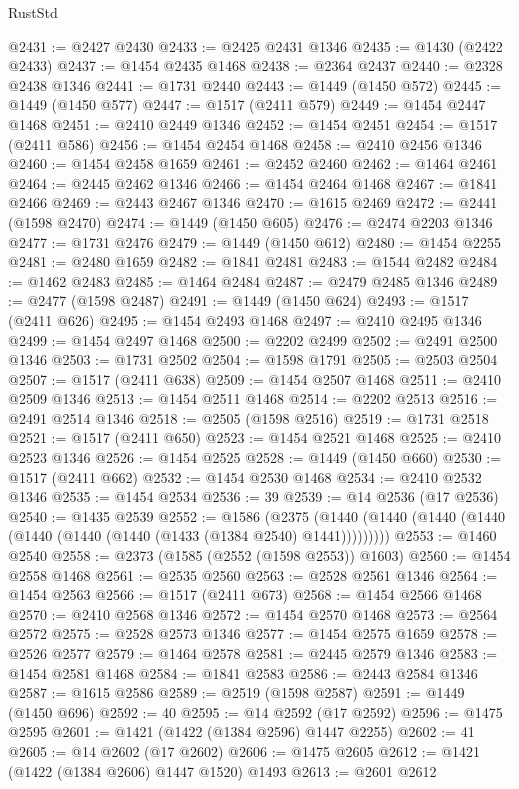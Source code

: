\begin{lexlean}{RustStd}
\begin{coremodule}
@2431 := @2427 @2430
@2433 := @2425 @2431 @1346
@2435 := @1430 (@2422 @2433)
@2437 := @1454 @2435 @1468
@2438 := @2364 @2437
@2440 := @2328 @2438 @1346
@2441 := @1731 @2440
@2443 := @1449 (@1450 @572)
@2445 := @1449 (@1450 @577)
@2447 := @1517 (@2411 @579)
@2449 := @1454 @2447 @1468
@2451 := @2410 @2449 @1346
@2452 := @1454 @2451
@2454 := @1517 (@2411 @586)
@2456 := @1454 @2454 @1468
@2458 := @2410 @2456 @1346
@2460 := @1454 @2458 @1659
@2461 := @2452 @2460
@2462 := @1464 @2461
@2464 := @2445 @2462 @1346
@2466 := @1454 @2464 @1468
@2467 := @1841 @2466
@2469 := @2443 @2467 @1346
@2470 := @1615 @2469
@2472 := @2441 (@1598 @2470)
@2474 := @1449 (@1450 @605)
@2476 := @2474 @2203 @1346
@2477 := @1731 @2476
@2479 := @1449 (@1450 @612)
@2480 := @1454 @2255
@2481 := @2480 @1659
@2482 := @1841 @2481
@2483 := @1544 @2482
@2484 := @1462 @2483
@2485 := @1464 @2484
@2487 := @2479 @2485 @1346
@2489 := @2477 (@1598 @2487)
@2491 := @1449 (@1450 @624)
@2493 := @1517 (@2411 @626)
@2495 := @1454 @2493 @1468
@2497 := @2410 @2495 @1346
@2499 := @1454 @2497 @1468
@2500 := @2202 @2499
@2502 := @2491 @2500 @1346
@2503 := @1731 @2502
@2504 := @1598 @1791
@2505 := @2503 @2504
@2507 := @1517 (@2411 @638)
@2509 := @1454 @2507 @1468
@2511 := @2410 @2509 @1346
@2513 := @1454 @2511 @1468
@2514 := @2202 @2513
@2516 := @2491 @2514 @1346
@2518 := @2505 (@1598 @2516)
@2519 := @1731 @2518
@2521 := @1517 (@2411 @650)
@2523 := @1454 @2521 @1468
@2525 := @2410 @2523 @1346
@2526 := @1454 @2525
@2528 := @1449 (@1450 @660)
@2530 := @1517 (@2411 @662)
@2532 := @1454 @2530 @1468
@2534 := @2410 @2532 @1346
@2535 := @1454 @2534
@2536 := 39
@2539 := @14 @2536 (@17 @2536)
@2540 := @1435 @2539
@2552 := @1586
    (@2375 (@1440 (@1440 (@1440 (@1440 (@1440 (@1440 (@1440 (@1433 (@1384 @2540) @1441)))))))))
@2553 := @1460 @2540
@2558 := @2373 (@1585 (@2552 (@1598 @2553)) @1603)
@2560 := @1454 @2558 @1468
@2561 := @2535 @2560
@2563 := @2528 @2561 @1346
@2564 := @1454 @2563
@2566 := @1517 (@2411 @673)
@2568 := @1454 @2566 @1468
@2570 := @2410 @2568 @1346
@2572 := @1454 @2570 @1468
@2573 := @2564 @2572
@2575 := @2528 @2573 @1346
@2577 := @1454 @2575 @1659
@2578 := @2526 @2577
@2579 := @1464 @2578
@2581 := @2445 @2579 @1346
@2583 := @1454 @2581 @1468
@2584 := @1841 @2583
@2586 := @2443 @2584 @1346
@2587 := @1615 @2586
@2589 := @2519 (@1598 @2587)
@2591 := @1449 (@1450 @696)
@2592 := 40
@2595 := @14 @2592 (@17 @2592)
@2596 := @1475 @2595
@2601 := @1421 (@1422 (@1384 @2596) @1447 @2255)
@2602 := 41
@2605 := @14 @2602 (@17 @2602)
@2606 := @1475 @2605
@2612 := @1421 (@1422 (@1384 @2606) @1447 @1520) @1493
@2613 := @2601 @2612

\end{coremodule}
\end{lexlean}

